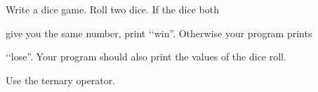 Write a dice game. Roll two dice. If the dice both

give you the same number, print \lq\lq win''. Otherwise your program prints

\lq\lq lose''. Your program should also print the values of the dice roll.

Use the ternary operator.

